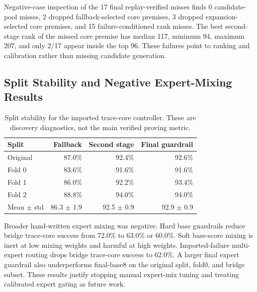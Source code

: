 \documentclass{article}
\begin{document}
Negative-case inspection of the 17 final replay-verified misses finds 0 candidate-pool misses, 2 dropped fallback-selected core premises, 3 dropped expansion-selected core premises, and 15 failure-conditioned rank misses. The best second-stage rank of the missed core premise has median 117, minimum 94, maximum 207, and only 2/17 appear inside the top 96. These failures point to ranking and calibration rather than missing candidate generation.

\subsection{Split Stability and Negative Expert-Mixing Results}

\begin{table}[H]
\caption{Split stability for the imported trace-core controller. These are discovery diagnostics, not the main verified proving metric.}
\label{tab:appendix-split-stability}
\centering
\small
\begin{tabular}{lrrr}
\toprule
Split & Fallback & Second stage & Final guardrail \\
\midrule
Original & 87.0\% & 92.4\% & 92.6\% \\
Fold 0 & 83.6\% & 91.6\% & 91.6\% \\
Fold 1 & 86.0\% & 92.2\% & 93.4\% \\
Fold 2 & 88.8\% & 94.0\% & 94.0\% \\
Mean $\pm$ std & 86.3 $\pm$ 1.9 & 92.5 $\pm$ 0.9 & 92.9 $\pm$ 0.9 \\
\bottomrule
\end{tabular}
\end{table}

Broader hand-written expert mixing was negative. Hard base guardrails reduce bridge trace-core success from 72.0\% to 63.0\% or 60.0\%. Soft base-score mixing is inert at low mixing weights and harmful at high weights. Imported-failure multi-expert routing drops bridge trace-core success to 62.0\%. A larger final expert guardrail also underperforms final-base8 on the original split, fold0, and bridge subset. These results justify stopping manual expert-mix tuning and treating calibrated expert gating as future work.
\end{document}
